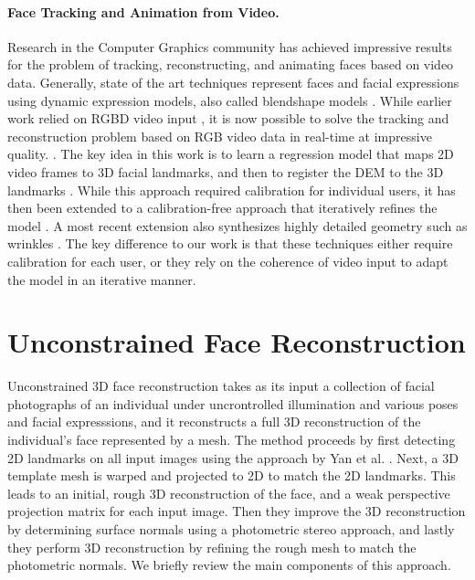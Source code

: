 \paragraph*{Face Tracking and Animation from Video.} Research in the Computer Graphics community has achieved impressive results for the problem of tracking, reconstructing, and animating faces based on video data. Generally, state of the art techniques represent faces and facial expressions using dynamic expression models, also called blendshape models \cite{Cao:2014:FWA}. While earlier work relied on RGBD video input \cite{Weise:2011:RPF,Li:2013:RFA,Bouaziz:2013:OMR}, it is now possible to solve the tracking and reconstruction problem based on RGB video data in real-time at impressive quality. \cite{Cao:2014:DDE,Cao:2015:RHF,GZCVVPT16,thies2016face}. The key idea in this work is to learn a regression model that maps 2D video frames to 3D facial landmarks, and then to register the DEM to the 3D landmarks \cite{Cao:2013:SRR}. While this approach required calibration for individual users, it has then been extended to a calibration-free approach that iteratively refines the model \cite{Cao:2014:DDE}. A most recent extension also synthesizes highly detailed geometry such as wrinkles \cite{Cao:2015:RHF}. The key difference to our work is that these techniques either require calibration for each user, or they rely on the coherence of video input to adapt the model in an iterative manner.


\section{Unconstrained Face Reconstruction}
\label{sec:unconstrainedfacereconstruction}

Unconstrained 3D face reconstruction \cite{Roth:2015:UFR} takes as its input  a collection of facial photographs of an individual under uncrontrolled illumination and various poses and facial expresssions, and it reconstructs a full 3D reconstruction of the individual's face represented by a mesh. The method proceeds by first detecting 2D landmarks on all input images using the approach by Yan et al. \cite{Yan:2013:LCM}. Next, a 3D template mesh is warped and projected to 2D to match the 2D landmarks. This leads to an initial, rough 3D reconstruction of the face, and a weak perspective projection matrix for each input image. Then they improve the 3D reconstruction by determining surface normals using a photometric stereo approach, and lastly they perform 3D reconstruction by refining the rough mesh to match the photometric normals. We briefly review the main components of this approach.

